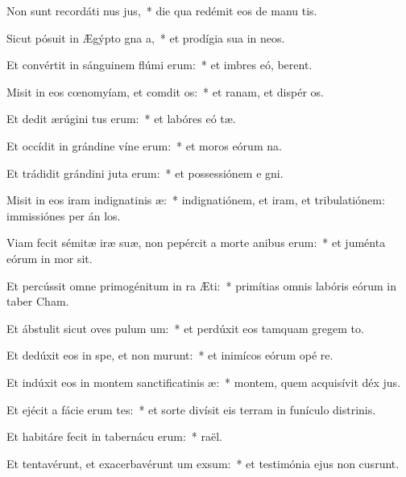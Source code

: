 \item Non sunt recordáti nus jus,~* die qua redémit eos de manu tis.
\item Sicut pósuit in Ægýpto gna a,~* et prodígia sua in  neos.
\item Et convértit in sánguinem flúmi erum:~* et imbres eó,  berent.
\item Misit in eos cœnomyíam, et comdit os:~* et ranam, et dispér os.
\item Et dedit ærúgini tus erum:~* et labóres eó tæ.
\item Et occídit in grándine víne erum:~* et moros eórum  na.
\item Et trádidit grándini juta erum:~* et possessiónem e gni.
\item Misit in eos iram indignatinis æ:~* indignatiónem, et iram, et tribulatiónem: immissiónes per án los.
\item Viam fecit sémitæ iræ suæ, non pepércit a morte anibus erum:~* et juménta eórum in mor sit.
\item Et percússit omne primogénitum in ra Æti:~* primítias omnis labóris eórum in taber Cham.
\item Et ábstulit sicut oves pulum um:~* et perdúxit eos tamquam gregem  to.
\item Et dedúxit eos in spe, et non murunt:~* et inimícos eórum opé re.
\item Et indúxit eos in montem sanctificatinis æ:~* montem, quem acquisívit déx jus.
\item Et ejécit a fácie erum tes:~* et sorte divísit eis terram in funículo distrinis.
\item Et habitáre fecit in tabernácu erum:~*  raël.
\item Et tentavérunt, et exacerbavérunt um exsum:~* et testimónia ejus non cusrunt.
